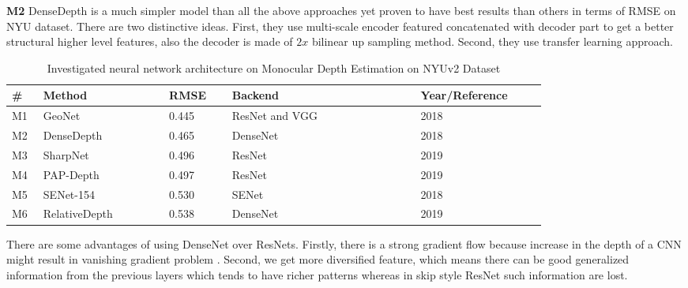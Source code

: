 \textbf{M2} DenseDepth is a much simpler model than all the above approaches yet proven to have best results than others in terms of RMSE on NYU dataset. There are two distinctive  ideas. First, they use multi-scale encoder featured concatenated with decoder part to get a better structural higher level features, also the decoder is made of \(2 x \) bilinear up sampling method. Second, they use transfer learning approach.  

\begin{table}[t]
\centering
\begin{tabular}{p{0.05\linewidth}p{0.2\linewidth}p{0.1\linewidth}p{0.3\linewidth}p{0.2\linewidth}}


\hline
\textbf{\# } & \textbf{Method} & \textbf{RMSE} & \textbf{Backend}& \textbf{Year/Reference} \\ \hline\hline
M1              & GeoNet          & 0.445             & ResNet and VGG  & 2018 \cite{qi2018geonet}          \\ \hline
M2              & DenseDepth      & 0.465             & DenseNet        & 2018 \cite{Alhashim2018}         \\ \hline
M3              & SharpNet        & 0.496             & ResNet       & 2019 \cite{ramamonjisoa2019sharpnet}\\ \hline
M4              & PAP-Depth       & 0.497             & ResNet          & 2019 \cite{Zhang_2019_CVPR}         \\ \hline
M5              & SENet-154       & 0.530             & SENet           & 2018 \cite{hu2019revisiting}          \\ \hline
M6              & RelativeDepth   & 0.538             & DenseNet        & 2019 \cite{lee2019monocular}          \\ \hline
\end{tabular}

\caption{Investigated neural network architecture on Monocular Depth Estimation on NYUv2 Dataset}
\label{table:RelatedWork_STA_Architecture}

\end{table}


There are some advantages of using DenseNet over ResNets. Firstly, there is a strong gradient flow because increase in the depth of a CNN might result in vanishing gradient problem . Second, we get more diversified feature, which means there can be good generalized information from the previous layers which tends to have richer patterns whereas in skip style ResNet such information are lost. 

